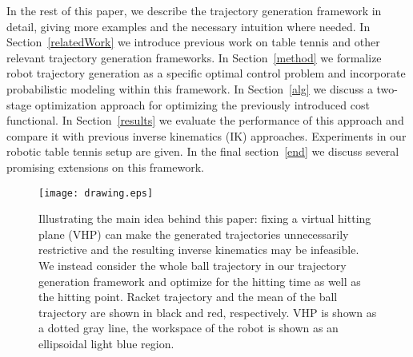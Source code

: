 In the rest of this paper, we describe the trajectory generation framework in detail, giving more examples and the necessary intuition where needed. In Section~\ref{relatedWork} we introduce previous work on table tennis and other relevant trajectory generation frameworks. In Section~\ref{method} we formalize robot trajectory generation as a specific optimal control problem and incorporate probabilistic modeling within this framework. In Section~\ref{alg} we discuss a two-stage optimization approach for optimizing the previously introduced cost functional. In Section~\ref{results} we evaluate the performance of this approach and compare it with previous inverse kinematics (IK) approaches. Experiments in our robotic table tennis setup are given. In the final section~\ref{end} we discuss several promising extensions on this framework. %

\begin{figure}[t!]
\centering
\texttt{[image: drawing.eps]}			
\caption{Illustrating the main idea behind this paper: fixing a virtual hitting plane (VHP) can make the generated trajectories unnecessarily restrictive and the resulting inverse kinematics may be infeasible. We instead consider the whole ball trajectory in our trajectory generation framework and optimize for the hitting time as well as the hitting point. Racket trajectory and the mean of the ball trajectory are shown in black and red, respectively. VHP is shown as a dotted gray line, the workspace of the robot is shown as an ellipsoidal light blue region.}
\label{mainIdea}
\end{figure}